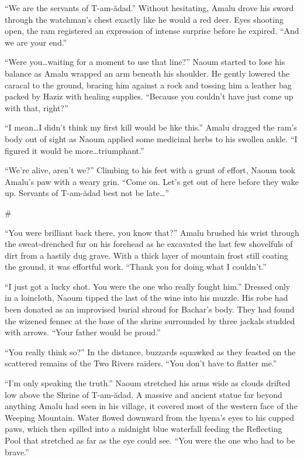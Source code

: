 ``We are the servants of T-am-ădad.'' Without hesitating, Amalu drove his sword through the watchman's chest exactly like he would a red deer. Eyes shooting open, the ram registered an expression of intense surprise before he expired. ``And we are your end.''

``Were you\ldots waiting for a moment to use that line?'' Naoum started to lose his balance as Amalu wrapped an arm beneath his shoulder. He gently lowered the caracal to the ground, bracing him against a rock and tossing him a leather bag packed by Haziz with healing supplies. ``Because you couldn't have just come up with that, right?''

``I mean\ldots I didn't think my first kill would be like this.'' Amalu dragged the ram's body out of sight as Naoum applied some medicinal herbs to his swollen ankle. ``I figured it would be more\ldots triumphant.''

``We're alive, aren't we?'' Climbing to his feet with a grunt of effort, Naoum took Amalu's paw with a weary grin. ``Come on. Let's get out of here before they wake up. Servants of T-am-ădad best not be late\ldots''

\#

``You were brilliant back there, you know that?'' Amalu brushed his wrist through the sweat-drenched fur on his forehead as he excavated the last few shovelfuls of dirt from a hastily dug grave. With a thick layer of mountain frost still coating the ground, it was effortful work. ``Thank you for doing what I couldn't.''

``I just got a lucky shot. You were the one who really fought him.'' Dressed only in a loincloth, Naoum tipped the last of the wine into his muzzle. His robe had been donated as an improvised burial shroud for Bachar's body. They had found the wizened fennec at the base of the shrine surrounded by three jackals studded with arrows. ``Your father would be proud.''

``You really think so?'' In the distance, buzzards squawked as they feasted on the scattered remains of the Two Rivers raiders. ``You don't have to flatter me.''

``I'm only speaking the truth.'' Naoum stretched his arms wide as clouds drifted low above the Shrine of T-am-ădad. A massive and ancient statue far beyond anything Amalu had seen in his village, it covered most of the western face of the Weeping Mountain. Water flowed downward from the hyena's eyes to his cupped paws, which then spilled into a midnight blue waterfall feeding the Reflecting Pool that stretched as far as the eye could see. ``You were the one who had to be brave.''

